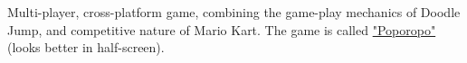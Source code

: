 \documentclass[letterpaper]{deedy-resume-openfont} %
\begin{document}
\begin{minipage}[t]{0.7\textwidth}
\sectionsep %



Multi-player, cross-platform game, combining the game-play mechanics of Doodle Jump, and competitive nature of Mario Kart. The game is called \href{http://poporopo.nimbusmog.com}{"Poporopo"} (looks better in half-screen).

\sectionsep %

\end{minipage} %

\end{document}
